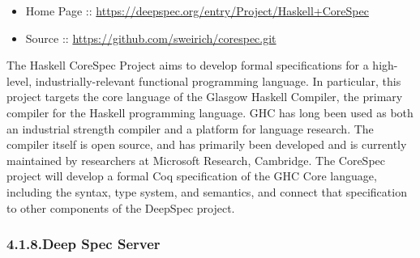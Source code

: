 \documentclass[12pt,twoside]{article}
\begin{document}
\begin{itemize}[noitemsep,topsep=\mdcompacttopsep]%

\item{}Home Page :: \href{https://deepspec.org/entry/Project/Haskell+CoreSpec}{{\ttfamily https://\hspace{0pt}deepspec.\hspace{0pt}org/\hspace{0pt}entry/\hspace{0pt}Project/\hspace{0pt}Haskell+\hspace{0pt}CoreSpec}}%

\item{}Source :: \href{https://github.com/sweirich/corespec.git}{{\ttfamily https://\hspace{0pt}github.\hspace{0pt}com/\hspace{0pt}sweirich/\hspace{0pt}corespec.\hspace{0pt}git}}%
\end{itemize}%

\noindent{}The Haskell CoreSpec Project aims to develop formal specifications for
a high-level, industrially-relevant functional programming
language. In particular, this project targets the core language of the
Glasgow Haskell Compiler, the primary compiler for the Haskell
programming language. GHC has long been used as both an industrial
strength compiler and a platform for language research. The compiler
itself is open source, and has primarily been developed and is
currently maintained by researchers at Microsoft Research,
Cambridge. The CoreSpec project will develop a formal Coq
specification of the GHC Core language, including the syntax, type
system, and semantics, and connect that specification to other
components of the DeepSpec project.%

\subsubsection{4.1.8.\hspace*{0.5em}Deep Spec Server}\label{sec-deep-spec-server}%
\end{document}
